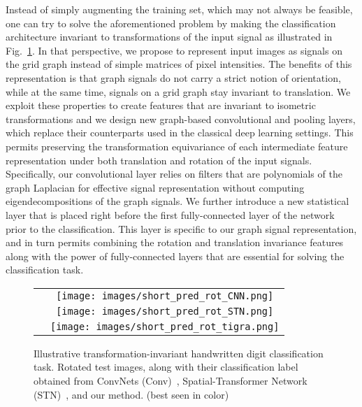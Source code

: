 \documentclass[10pt,journal,compsoc]{IEEEtran}
\begin{document}
	Instead of simply augmenting the training set, which may not always be feasible, one can try to solve the aforementioned problem by making the classification architecture invariant to transformations of the input signal as illustrated in Fig.~\ref{fig:adv}. In that perspective, we propose to represent input images as signals on the grid graph instead of simple matrices of pixel intensities. The benefits of this representation is that graph signals do not carry a strict notion of orientation, while at the same time, signals on a grid graph stay invariant to translation. We exploit these properties to create features that are invariant to isometric transformations and we design new graph-based convolutional and pooling layers, which replace their counterparts used in the classical deep learning settings. This permits preserving the transformation equivariance of each intermediate feature representation under both translation and rotation of the input signals. Specifically, our convolutional layer relies on filters that are polynomials of the graph Laplacian for effective signal representation without computing eigendecompositions of the graph signals. We further introduce a new statistical layer that is placed right before the first fully-connected layer of the network prior to the classification. This layer is specific to our graph signal representation, and in turn permits combining the rotation and translation invariance features along with the power of fully-connected layers that are essential for solving the classification task. 
	\begin{figure}
		\centering
		\begin{tabular}{cc}
			\raisebox{0.2cm}{\rotatebox{90}{Conv}} &
			\texttt{[image: images/short\_pred\_rot\_CNN.png]} \\
			\raisebox{0.2cm}{\rotatebox{90}{STN}} &
			\texttt{[image: images/short\_pred\_rot\_STN.png]} \\
			\raisebox{0.cm}{\rotatebox{90}{TIGraNet}} &
			\texttt{[image: images/short\_pred\_rot\_tigra.png]} \\
		\end{tabular}
		\caption{Illustrative transformation-invariant handwritten digit classification task. Rotated test images, along with their classification label obtained from ConvNets (Conv)~\cite{bb:lecun}, Spatial-Transformer Network (STN)~\cite{bb:STN}, and our method. (best seen in color)}
		\label{fig:adv}
	\end{figure}
\end{document}
